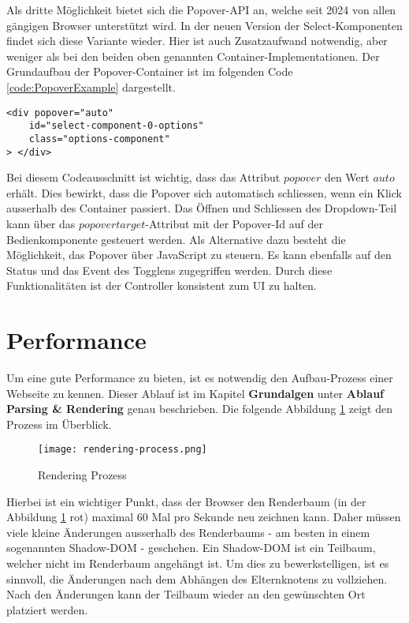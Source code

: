Als dritte Möglichkeit bietet sich die Popover-API an, welche seit 2024 von allen gängigen Browser unterstützt wird.
In der neuen Version der Select-Komponenten findet sich diese Variante wieder.
Hier ist auch Zusatzaufwand notwendig, aber weniger als bei den beiden oben genannten Container-Implementationen.
Der Grundaufbau der Popover-Container ist im folgenden Code \ref{code:PopoverExample} dargestellt.

\begin{lstlisting}[style = htmlcssjs, caption = Popover-Container Beispiel, label = code:PopoverExample]
<div popover="auto"
    id="select-component-0-options" 
    class="options-component" 
> </div>
\end{lstlisting}

Bei diesem Codeausschnitt ist wichtig, dass das Attribut $popover$ den Wert $auto$ erhält.
Dies bewirkt, dass die Popover sich automatisch schliessen, wenn ein Klick ausserhalb des Container passiert.
Das Öffnen und Schliessen des Dropdown-Teil kann über das $popovertarget$-Attribut mit der Popover-Id auf der Bedienkomponente gesteuert werden.
Als Alternative dazu besteht die Möglichkeit, das Popover über JavaScript zu steuern.
Es kann ebenfalls auf den Status und das Event des Togglens zugegriffen werden.
Durch diese Funktionalitäten ist der Controller konsistent zum UI zu halten.


\section{Performance}

Um eine gute Performance zu bieten, ist es notwendig den Aufbau-Prozess einer Webseite zu kennen.
Dieser Ablauf ist im Kapitel \textbf{Grundalgen} unter \textbf{Ablauf Parsing \& Rendering} genau beschrieben.
Die folgende Abbildung \ref{Abbildung:RenderingProcessRecap} zeigt den Prozess im Überblick.

\begin{figure}[!htb]
    \centering
    \texttt{[image: rendering-process.png]}
    \caption{Rendering Prozess}
    \label{Abbildung:RenderingProcessRecap}
\end{figure}

Hierbei ist ein wichtiger Punkt, dass der Browser den Renderbaum (in der Abbildung \ref{Abbildung:RenderingProcessRecap} rot) maximal 60 Mal pro Sekunde neu zeichnen kann.
Daher müssen viele kleine Änderungen ausserhalb des Renderbaums - am besten in einem sogenannten Shadow-DOM - geschehen.
Ein Shadow-DOM ist ein Teilbaum, welcher nicht im Renderbaum angehängt ist.
Um dies zu bewerkstelligen, ist es sinnvoll, die Änderungen nach dem Abhängen des Elternknotens zu vollziehen. 
Nach den Änderungen kann der Teilbaum wieder an den gewünschten Ort platziert werden.

